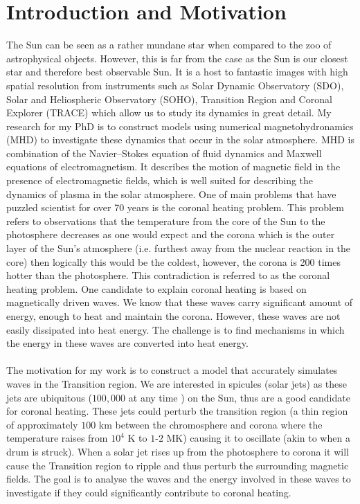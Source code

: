 \documentclass[12pt]{ociamthesis}
\begin{document}
\section{Introduction and Motivation}
The Sun can be seen as a rather mundane star when compared to the zoo of astrophysical objects. However, this is far from the case as the Sun is our closest star and therefore best observable Sun. It is a host to fantastic images with high spatial resolution from instruments such as Solar Dynamic Observatory (SDO), Solar and Heliospheric Observatory (SOHO), Transition Region and Coronal Explorer (TRACE) which allow us to study its dynamics in great detail. My research for my PhD is to construct models using numerical magnetohydronamics (MHD) to investigate these dynamics that occur in the solar atmosphere. MHD is combination of the Navier$–$Stokes equation of fluid dynamics and Maxwell equations of electromagnetism. It describes the motion of magnetic field in the presence of electromagnetic fields, which is well suited for describing the dynamics of plasma in the solar atmosphere. One of main problems that have puzzled scientist for over 70 years is the coronal heating problem. This problem refers to observations that the temperature from the core of the Sun to the photosphere decreases as one would expect and the corona which is the outer layer of the Sun's atmosphere (i.e. furthest away from the nuclear reaction in the core) then logically this would be the coldest, however, the corona is 200 times hotter than the photosphere. This contradiction is referred to as the coronal heating problem. One candidate to explain coronal heating is based on magnetically driven waves. We know that these waves carry significant amount of energy, enough to heat and maintain the corona. However, these waves are not easily dissipated into heat energy. The challenge is to find mechanisms in which the energy in these waves are converted into heat energy.  \\ \\
The motivation for my work is to construct a model that accurately simulates waves in the Transition region. We are interested in spicules (solar jets) as these jets are ubiquitous ($100,000$  at  any  time \citep{Beckers1968}) on the Sun, thus are a good candidate for coronal heating. These jets could perturb the transition region (a thin region of approximately $100$ km between the chromosphere and corona where the temperature raises from $10^4$ K to $1$-$2$ MK) causing it to oscillate (akin to when a drum is struck). When a solar jet rises up from the photosphere to corona it will cause the Transition region to ripple and thus perturb the surrounding magnetic fields. The goal is to analyse the waves and the energy involved in these waves to investigate if they could significantly contribute to coronal heating. 
\end{document}
